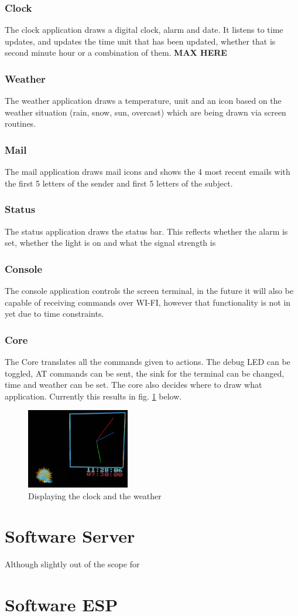 \subsubsection{Clock}
The clock application draws a digital clock, alarm and date. It listens to time updates, and updates the time unit that has been updated, whether that is second minute hour or a combination of them. \textbf{MAX HERE}
\subsubsection{Weather}
The weather application draws a temperature, unit and an icon based on the weather situation (rain, snow, sun, overcast) which are being drawn via screen routines. 
\subsubsection{Mail}
The mail application draws mail icons and shows the 4 most recent emails with the first 5 letters of the sender and first 5 letters of the subject.
\subsubsection{Status}
The status application draws the status bar. This reflects whether the alarm is set, whether the light is on and what the signal strength is
\subsubsection{Console}
The console application controls the screen terminal, in the future it will also be capable of receiving commands over WI-FI, however that functionality is not in yet due to time constraints.
\subsubsection{Core}
The Core translates all the commands given to actions. The debug LED can be toggled, AT commands can be sent, the sink for the terminal can be changed, time and weather can be set. The core also decides where to draw what application. Currently this results in fig. \ref{fig:clock_weather} below.
\begin{figure}[H]
	\centering
	\label{fig:clock_weather}
	\includegraphics[width=0.4\textwidth]{./fig/clock_weather.png}
	\caption{Displaying the clock and the weather}
\end{figure}
\section{Software Server}
Although slightly out of the scope for 
\section{Software ESP}